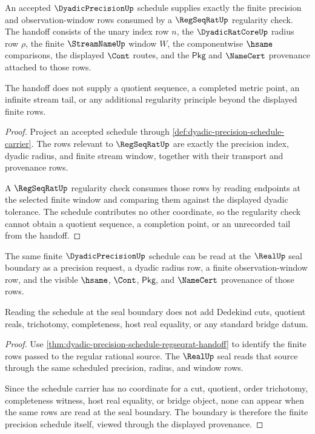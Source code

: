 \begin{theorem}
\label{thm:dyadic-precision-schedule-regseqrat-handoff}
An accepted $\DyadicPrecisionUp$ schedule supplies exactly the finite precision and observation-window rows consumed by a $\RegSeqRatUp$ regularity check. The handoff consists of the unary index row $n$, the $\DyadicRatCoreUp$ radius row $\rho$, the finite $\StreamNameUp$ window $W$, the componentwise $\hsame$ comparisons, the displayed $\Cont$ routes, and the $\mathsf{Pkg}$ and $\NameCert$ provenance attached to those rows.

The handoff does not supply a quotient sequence, a completed metric point, an infinite stream tail, or any additional regularity principle beyond the displayed finite rows.
\end{theorem}
\begin{proof}
Project an accepted schedule through \autoref{def:dyadic-precision-schedule-carrier}. The rows relevant to $\RegSeqRatUp$ are exactly the precision index, dyadic radius, and finite stream window, together with their transport and provenance rows.

A $\RegSeqRatUp$ regularity check consumes those rows by reading endpoints at the selected finite window and comparing them against the displayed dyadic tolerance. The schedule contributes no other coordinate, so the regularity check cannot obtain a quotient sequence, a completion point, or an unrecorded tail from the handoff.
\end{proof}

\begin{theorem}
\label{thm:dyadic-precision-schedule-realup-boundary}
The same finite $\DyadicPrecisionUp$ schedule can be read at the $\RealUp$ seal boundary as a precision request, a dyadic radius row, a finite observation-window row, and the visible $\hsame$, $\Cont$, $\mathsf{Pkg}$, and $\NameCert$ provenance of those rows.

Reading the schedule at the seal boundary does not add Dedekind cuts, quotient reals, trichotomy, completeness, host real equality, or any standard bridge datum.
\end{theorem}
\begin{proof}
Use \autoref{thm:dyadic-precision-schedule-regseqrat-handoff} to identify the finite rows passed to the regular rational source. The $\RealUp$ seal reads that source through the same scheduled precision, radius, and window rows.

Since the schedule carrier has no coordinate for a cut, quotient, order trichotomy, completeness witness, host real equality, or bridge object, none can appear when the same rows are read at the seal boundary. The boundary is therefore the finite precision schedule itself, viewed through the displayed provenance.
\end{proof}

